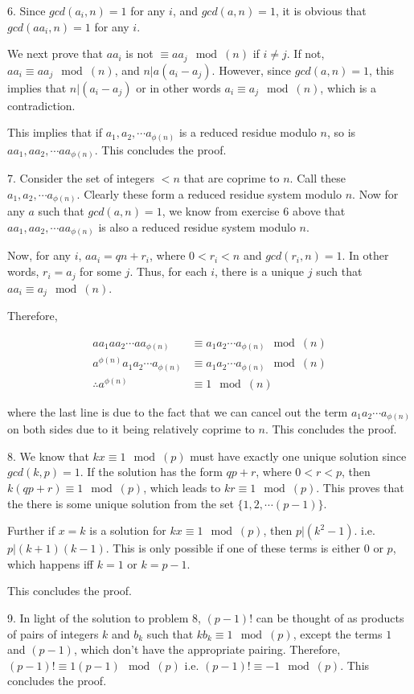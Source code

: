 \documentclass{article}
\begin{document}
6. Since $gcd(a_i, n) = 1$ for any $i$, and $gcd(a, n) = 1$, it is obvious that $gcd(aa_i, n) = 1$ for any $i$.

We next prove that $aa_i$ is not $\equiv aa_j \mod(n)$ if $i \ne j$. If not, $aa_i \equiv aa_j \mod(n)$, and $n | a(a_i - a_j)$. However, since $gcd(a, n) = 1$, this implies that $n | (a_i - a_j)$ or in other words $a_i \equiv a_j \mod(n)$, which is a contradiction.

This implies that if $a_1, a_2, \cdots a_{\phi(n)}$ is a reduced residue modulo $n$, so is $aa_1, aa_2, \cdots aa_{\phi(n)}$. This concludes the proof.

7. Consider the set of integers $< n$ that are coprime to $n$. Call these $a_1, a_2, \cdots a_{\phi(n)}$. Clearly these form a reduced residue system modulo $n$. Now for any $a$ such that $gcd(a, n) = 1$, we know from exercise 6 above that $aa_1, aa_2, \cdots aa_{\phi(n)}$ is also a reduced residue system modulo $n$.

Now, for any $i$, $aa_i = qn + r_i$, where $0 < r_i < n$ and $gcd(r_i, n) = 1$. In other words, $r_i = a_j$ for some $j$. Thus, for each $i$, there is a unique $j$ such that $aa_i \equiv a_j \mod(n)$.

Therefore,

\begin{align*}
    aa_1 aa_2 \cdots aa_{\phi(n)} & \equiv a_1 a_2 \cdots a_{\phi(n)} \mod(n) \\
    a^{\phi(n)} a_1 a_2 \cdots a_{\phi(n)} & \equiv a_1 a_2 \cdots a_{\phi(n)} \mod(n) \\
    \therefore a^{\phi(n)} & \equiv 1 \mod(n)
\end{align*}

where the last line is due to the fact that we can cancel out the term $a_1 a_2 \cdots a_{\phi(n)}$ on both sides due to it being relatively coprime to $n$. This concludes the proof. 

8. We know that $kx \equiv 1 \mod(p)$ must have exactly one unique solution since $gcd(k, p) = 1$. If the solution has the form $qp + r$, where $0 < r < p$, then $k(qp + r) \equiv 1 \mod(p)$, which leads to $kr \equiv 1 \mod(p)$. This proves that the there is some unique solution from the set $\{1, 2, \cdots (p - 1)\}$.

Further if $x = k$ is a solution for $kx \equiv 1 \mod(p)$, then $p | (k^2 - 1)$. i.e. $p | (k + 1)(k - 1)$. This is only possible if one of these terms is either $0$ or $p$, which happens iff $k = 1$ or $k = p - 1$.

This concludes the proof.

9. In light of the solution to problem 8, $(p - 1)!$ can be thought of as products of pairs of integers $k$ and $b_k$ such that $kb_k \equiv 1 \mod(p)$, except the terms $1$ and $(p - 1)$, which don't have the appropriate pairing. Therefore, $(p - 1)! \equiv 1 (p - 1) \mod(p)$ i.e. $(p - 1)! \equiv -1 \mod(p)$. This concludes the proof.
\end{document}
